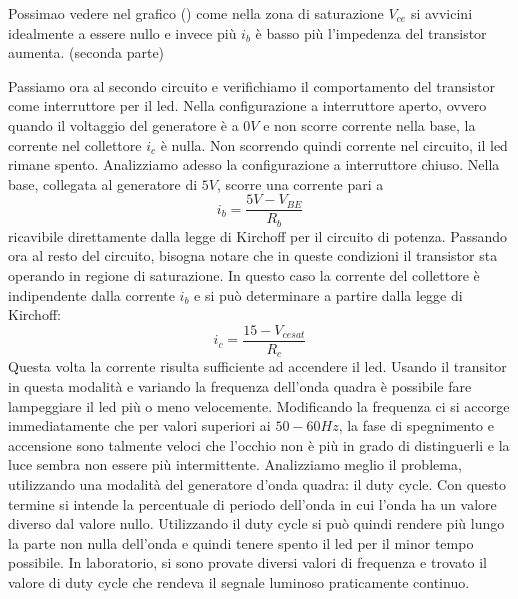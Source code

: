 \documentclass[letterpaper,11pt]{article}
\begin{document}
\begin{body}
Possimao vedere nel grafico () come nella zona di saturazione $V_{ce}$ si avvicini idealmente a essere nullo e invece più $i_b$ è basso più l'impedenza del transistor aumenta.
(seconda parte) 

Passiamo ora al secondo circuito e verifichiamo il comportamento del transistor come interruttore per il led. Nella configurazione a interruttore aperto, ovvero quando il voltaggio del generatore è a $0 V$ e non scorre corrente nella base, la corrente nel collettore $i_c$ è nulla. Non scorrendo quindi corrente nel circuito, il led rimane spento. Analizziamo adesso la configurazione a interruttore chiuso. Nella base, collegata al generatore di $ 5 V$, scorre una corrente pari a 
\begin{equation}
i_b = \frac{5V - V_{BE}}{R_b}  
\end{equation}
ricavibile direttamente dalla legge di Kirchoff per il circuito di potenza. Passando ora al resto del circuito, bisogna notare che in queste condizioni il transistor sta operando in regione di saturazione. In questo caso la corrente del collettore è indipendente dalla corrente $i_b$ e si può determinare a partire dalla legge di Kirchoff: 
\begin{equation}
i_c = \frac{15 - V_{cesat}}{R_c}
\end{equation}
Questa volta la corrente risulta sufficiente ad accendere il led. 
Usando il transitor in questa modalità e variando la frequenza dell'onda quadra è possibile fare lampeggiare il led più o meno velocemente. Modificando la frequenza ci si accorge immediatamente che per valori superiori ai $ 50-60 Hz$, la fase di spegnimento e accensione sono talmente veloci che l'occhio non è più in grado di distinguerli e la luce sembra non essere più intermittente. \newline
Analizziamo meglio il problema, utilizzando una modalità del generatore d'onda quadra: il duty cycle. Con questo termine si intende la percentuale di periodo dell'onda in cui l'onda ha un valore diverso dal valore nullo. Utilizzando il duty cycle si può quindi rendere più lungo la parte non nulla dell'onda e quindi tenere spento il led per il minor tempo possibile. In laboratorio, si sono provate diversi valori di frequenza e trovato il valore di duty cycle che rendeva il segnale luminoso praticamente continuo. 



\end{body}
\end{document}
